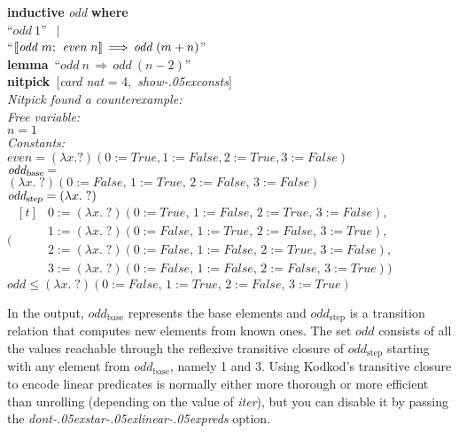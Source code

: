 \documentclass[a4paper,12pt]{article}
\def\unk{{?}}
\def\unkef{(\lambda x.\; \unk)}
\renewcommand\_{\hbox{\textunderscore\kern-.05ex}}
\begin{document}
\prew
\textbf{inductive} \textit{odd} \textbf{where} \\
``$\textit{odd}~1$'' $\,\mid$ \\
``$\mathopen{[\![} \textit{odd}~m;\>\, \textit{even}~n\mathclose{]\!]} \,\Longrightarrow\, \textit{odd}~(m + n)$'' \\[2\smallskipamount]
\textbf{lemma}~``$\textit{odd}~n \,\Longrightarrow\, \textit{odd}~(n - 2)$'' \\
\textbf{nitpick}~[\textit{card nat} = 4,\, \textit{show\_consts}] \\[2\smallskipamount]
\slshape Nitpick found a counterexample:
\\[2\smallskipamount]
\hbox{}\qquad Free variable: \nopagebreak \\
\hbox{}\qquad\qquad $n = 1$ \\
\hbox{}\qquad Constants: \nopagebreak \\
\hbox{}\qquad\qquad $\textit{even} = (λx. ?)(0 := True, 1 := False, 2 := True, 3 := False)$ \\
\hbox{}\qquad\qquad $\textit{odd}_{\textsl{base}} = {}$ \\
\hbox{}\qquad\qquad\quad $\unkef(0 := \textit{False},\, 1 := \textit{True},\, 2 := \textit{False},\, 3 := \textit{False})$ \\
\hbox{}\qquad\qquad $\textit{odd}_{\textsl{step}} = \unkef$\\
\hbox{}\qquad\qquad\quad $(
\!\begin{aligned}[t]
& 0 := \unkef(0 := \textit{True},\, 1 := \textit{False},\, 2 := \textit{True},\, 3 := \textit{False}), \\[-2pt]
& 1 := \unkef(0 := \textit{False},\, 1 := \textit{True},\, 2 := \textit{False},\, 3 := \textit{True}), \\[-2pt]
& 2 := \unkef(0 := \textit{False},\, 1 := \textit{False},\, 2 := \textit{True},\, 3 := \textit{False}), \\[-2pt]
& 3 := \unkef(0 := \textit{False},\, 1 := \textit{False},\, 2 := \textit{False},\, 3 := \textit{True}))
\end{aligned}$ \\
\hbox{}\qquad\qquad $\textit{odd} \leq \unkef(0 := \textit{False},\, 1 := \textit{True},\, 2 := \textit{False},\, 3 := \textit{True})$
\postw

\noindent
In the output, $\textit{odd}_{\textrm{base}}$ represents the base elements and
$\textit{odd}_{\textrm{step}}$ is a transition relation that computes new
elements from known ones. The set $\textit{odd}$ consists of all the values
reachable through the reflexive transitive closure of
$\textit{odd}_{\textrm{step}}$ starting with any element from
$\textit{odd}_{\textrm{base}}$, namely 1 and 3. Using Kodkod's
transitive closure to encode linear predicates is normally either more thorough
or more efficient than unrolling (depending on the value of \textit{iter}), but
you can disable it by passing the \textit{dont\_star\_linear\_preds} option.
\end{document}
